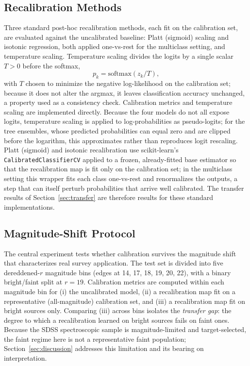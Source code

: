 \documentclass[conference]{IEEEtran}
\begin{document}
\subsection{Recalibration Methods}\label{sec:recal}
Three standard post-hoc recalibration methods, each fit on the calibration set, are evaluated against the uncalibrated baseline: Platt (sigmoid) scaling and isotonic regression, both applied one-vs-rest for the multiclass setting, and temperature scaling. Temperature scaling divides the logits by a single scalar $T>0$ before the softmax,
\begin{equation}
p_k = \mathrm{softmax}(z_k / T),
\end{equation}
with $T$ chosen to minimize the negative log-likelihood on the calibration set; because it does not alter the argmax, it leaves classification accuracy unchanged, a property used as a consistency check. Calibration metrics and temperature scaling are implemented directly. Because the four models do not all expose logits, temperature scaling is applied to log-probabilities as pseudo-logits; for the tree ensembles, whose predicted probabilities can equal zero and are clipped before the logarithm, this approximates rather than reproduces logit rescaling. Platt (sigmoid) and isotonic recalibration use scikit-learn's \texttt{CalibratedClassifierCV} applied to a frozen, already-fitted base estimator so that the recalibration map is fit only on the calibration set; in the multiclass setting this wrapper fits each class one-vs-rest and renormalizes the outputs, a step that can itself perturb probabilities that arrive well calibrated. The transfer results of Section~\ref{sec:transfer} are therefore results for these standard implementations.

\subsection{Magnitude-Shift Protocol}\label{sec:shift}
The central experiment tests whether calibration survives the magnitude shift that characterizes real survey application. The test set is divided into five dereddened-$r$ magnitude bins (edges at 14, 17, 18, 19, 20, 22), with a binary bright/faint split at $r=19$. Calibration metrics are computed within each magnitude bin for (i) the uncalibrated model, (ii) a recalibration map fit on a representative (all-magnitude) calibration set, and (iii) a recalibration map fit on bright sources only. Comparing (iii) across bins isolates the \emph{transfer gap}: the degree to which a recalibration learned on bright sources fails on faint ones. Because the SDSS spectroscopic sample is magnitude-limited and target-selected, the faint regime here is not a representative faint population; Section~\ref{sec:discussion} addresses this limitation and its bearing on interpretation.
\end{document}
